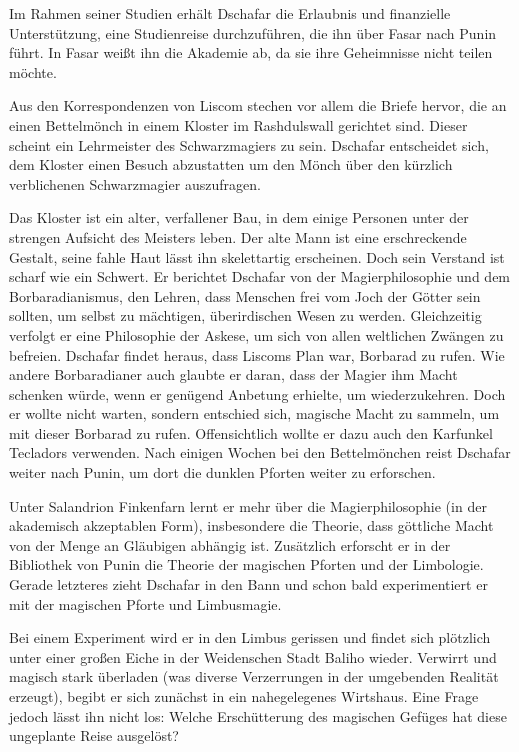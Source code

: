 Im Rahmen seiner Studien erhält Dschafar die Erlaubnis und finanzielle
Unterstützung, eine Studienreise durchzuführen, die ihn über Fasar nach
Punin führt. In Fasar weißt ihn die Akademie ab, da sie ihre Geheimnisse
nicht teilen möchte.

Aus den Korrespondenzen von Liscom stechen vor allem die Briefe hervor,
die an einen Bettelmönch in einem Kloster im Rashdulswall gerichtet
sind. Dieser scheint ein Lehrmeister des Schwarzmagiers zu sein.
Dschafar entscheidet sich, dem Kloster einen Besuch abzustatten um den
Mönch über den kürzlich verblichenen Schwarzmagier auszufragen.

Das Kloster ist ein alter, verfallener Bau, in dem einige Personen unter
der strengen Aufsicht des Meisters leben. Der alte Mann ist eine
erschreckende Gestalt, seine fahle Haut lässt ihn skelettartig
erscheinen. Doch sein Verstand ist scharf wie ein Schwert. Er berichtet
Dschafar von der Magierphilosophie und dem Borbaradianismus, den Lehren,
dass Menschen frei vom Joch der Götter sein sollten, um selbst zu
mächtigen, überirdischen Wesen zu werden. Gleichzeitig verfolgt er eine
Philosophie der Askese, um sich von allen weltlichen Zwängen zu
befreien. Dschafar findet heraus, dass Liscoms Plan war, Borbarad zu
rufen. Wie andere Borbaradianer auch glaubte er daran, dass der Magier
ihm Macht schenken würde, wenn er genügend Anbetung erhielte, um
wiederzukehren. Doch er wollte nicht warten, sondern entschied sich,
magische Macht zu sammeln, um mit dieser Borbarad zu rufen.
Offensichtlich wollte er dazu auch den Karfunkel Tecladors verwenden.
Nach einigen Wochen bei den Bettelmönchen reist Dschafar weiter nach
Punin, um dort die dunklen Pforten weiter zu erforschen.

Unter Salandrion Finkenfarn lernt er mehr über die Magierphilosophie (in
der akademisch akzeptablen Form), insbesondere die Theorie, dass
göttliche Macht von der Menge an Gläubigen abhängig ist. Zusätzlich
erforscht er in der Bibliothek von Punin die Theorie der magischen
Pforten und der Limbologie. Gerade letzteres zieht Dschafar in den Bann
und schon bald experimentiert er mit der magischen Pforte und
Limbusmagie.

Bei einem Experiment wird er in den Limbus gerissen und findet sich
plötzlich unter einer großen Eiche in der Weidenschen Stadt Baliho
wieder. Verwirrt und magisch stark überladen (was diverse Verzerrungen
in der umgebenden Realität erzeugt), begibt er sich zunächst in ein
nahegelegenes Wirtshaus. Eine Frage jedoch lässt ihn nicht los: Welche
Erschütterung des magischen Gefüges hat diese ungeplante Reise
ausgelöst?
